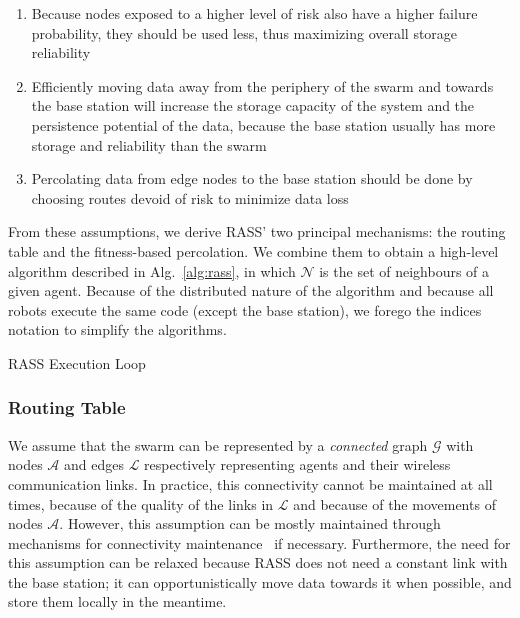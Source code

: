 \documentclass[sigconf]{aamas}
\begin{document}
\begin{enumerate}
\item Because nodes exposed to a higher level of risk also have a higher
  failure probability, they should be used less, thus
  maximizing overall storage reliability
\item Efficiently moving data away from the periphery of the swarm and
  towards the base station will increase the storage capacity of the
  system and the persistence potential of the data, because the base
  station usually has more storage and reliability than the swarm
\item Percolating data from edge nodes to the base station should be
  done by choosing routes devoid of risk to minimize data loss
\end{enumerate}
From these assumptions, we derive RASS' two principal mechanisms: the routing table and the fitness-based percolation. We combine them to obtain a high-level algorithm described in Alg.~\ref{alg:rass}, in which $\mathcal{N}$ is the set of neighbours of a given agent. Because of the distributed nature of the algorithm and because all robots execute the same code (except the base station), we forego the indices notation to simplify the algorithms.


\begin{algorithm}[h]
\small
\SetAlgoLined
\DontPrintSemicolon
 \caption{RASS Execution Loop}
 \label{alg:rass}
\end{algorithm}



\subsubsection{Routing Table}
\label{section:routingTable}
We assume that the swarm can be represented by a
\textit{connected} graph
$\mathcal{G}$ with nodes $\mathcal{A}$ and edges $\mathcal{L}$
respectively representing agents and their wireless communication
links. In practice, this connectivity cannot be maintained at all times, because of the quality of the links in $\mathcal{L}$ and because of the movements of nodes $\mathcal{A}$. However, this assumption can be mostly maintained through mechanisms for connectivity maintenance~\cite{varadharajan2020swarm} if necessary. Furthermore, the need for this assumption can be relaxed because RASS does not need a constant link with the base station; it can opportunistically move data towards it when possible, and store them locally in the meantime.
\end{document}
